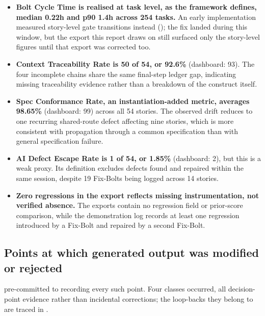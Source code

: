 \begin{itemize}[leftmargin=0.6cm, itemsep=0.5em]

\item \textbf{Bolt Cycle Time is realised at task level, as the framework defines, median 0.22h and p90 1.4h across 254 tasks.} An early implementation measured story-level gate transitions instead (); the fix landed during this window, but the export this report draws on still surfaced only the story-level figures until that export was corrected too.

\item \textbf{Context Traceability Rate is 50 of 54, or 92.6\%} (dashboard: 93). The four incomplete chains share the same final-step ledger gap, indicating missing traceability evidence rather than a breakdown of the construct itself.

\item \textbf{Spec Conformance Rate, an instantiation-added metric, averages 98.65\%} (dashboard: 99) across all 54 stories. The observed drift reduces to one recurring shared-route defect affecting nine stories, which is more consistent with propagation through a common specification than with general specification failure.

\item \textbf{AI Defect Escape Rate is 1 of 54, or 1.85\%} (dashboard: 2), but this is a weak proxy. Its definition excludes defects found and repaired within the same session, despite 19 Fix-Bolts being logged across 14 stories.

\item \textbf{Zero regressions in the export reflects missing instrumentation, not verified absence.} The exports contain no regression field or prior-score comparison, while the demonstration log records at least one regression introduced by a Fix-Bolt and repaired by a second Fix-Bolt.

\end{itemize}


\subsection*{Points at which generated output was modified or rejected}

 pre-committed to recording every such point. Four classes occurred, all decision-point evidence rather than incidental corrections; the loop-backs they belong to are traced in .

